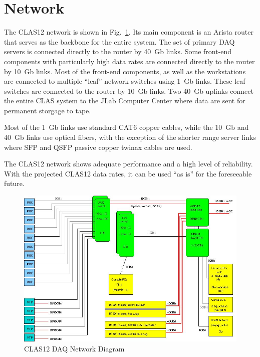 \section{Network}

The CLAS12 network is shown in Fig.~\ref{fig:network_diagram}. Its main component is an Arista router that serves as the backbone for the entire system. The set of primary DAQ servers is connected directly to the router by 40~Gb links. Some front-end components with particularly high data rates are connected directly to the router by 10~Gb links. Most of the front-end components, as well as the workstations are connected to multiple ``leaf'' network switches using 1~Gb links. These leaf switches are connected to the router by 10~Gb links. Two 40~Gb uplinks connect the entire CLAS system to the JLab Computer Center where data are sent for permanent storgage to tape.

Most of the 1~Gb links use standard CAT6 copper cables, while the 10~Gb and 40~Gb links use optical fibers, with the exception of the shorter range server links where SFP and QSFP passive copper twinax cables are used.

The CLAS12 network shows adequate performance and a high level of reliability. With the projected CLAS12 data rates, it can be used ``as is'' for the foreseeable future.

\begin{figure}[hbt]
	\centering
	\includegraphics[width=1.0\columnwidth,keepaspectratio]{img/CLAS12_NET_1.jpg}
	\caption{CLAS12 DAQ Network Diagram}
	\label{fig:network_diagram}
\end{figure}
